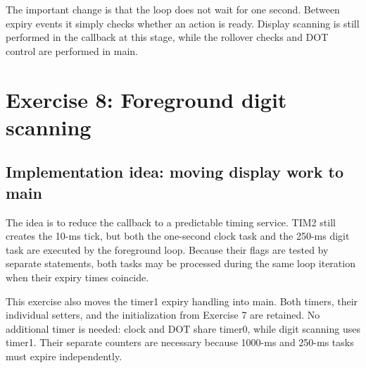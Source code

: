 \documentclass[a4paper]{article}
\newcommand{\code}[1]{\texttt{\detokenize{#1}}}
\newcommand{\topic}[1]{\subsection{#1}}
\begin{document}
The important change is that the loop does not wait for one second. Between
expiry events it simply checks whether an action is ready. Display scanning
is still performed in the callback at this stage, while the rollover checks
and DOT control are performed in main.

\section{Exercise 8: Foreground digit scanning}
\topic{Implementation idea: moving display work to main}
The idea is to reduce the callback to a predictable timing service. TIM2 still
creates the 10-ms tick, but both the one-second clock task and the 250-ms digit
task are executed by the foreground loop. Because their flags are tested by
separate \code{if} statements, both tasks may be processed during the same
loop iteration when their expiry times coincide.

This exercise also moves the timer1 expiry handling into main. Both timers,
their individual setters, and the initialization from Exercise 7 are retained.
No additional timer is needed: clock and DOT share timer0, while digit scanning
uses timer1. Their separate counters are necessary because 1000-ms and 250-ms
tasks must expire independently.
\end{document}
